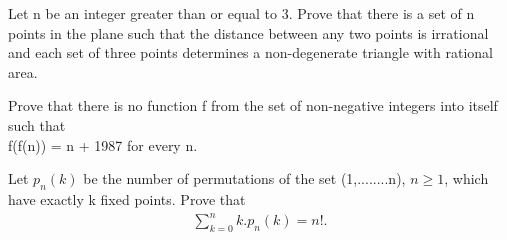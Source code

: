 \item Let n be an integer greater than or equal to 3. Prove that there is a set of n points in the plane such that the distance between any two points is irrational and each set of three points determines a non-degenerate triangle with rational area.

\item Prove that there is no function f from the set of non-negative integers into itself such that\\ 
f(f(n)) = n + 1987 for every n.

\item Let $p_{n}(k)$ be the number of permutations of the set (1,........n), $n \geq 1$, which have exactly k fixed points. Prove that
\begin{align*}
\sum_{k=0}^{n} k.p_n(k) = n!.
\end{align*}







